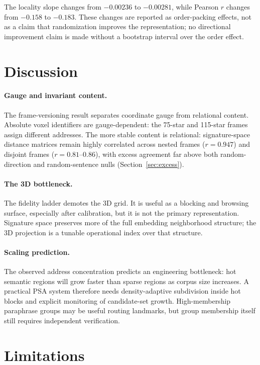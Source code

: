 \documentclass[11pt]{article}
\begin{document}
The locality slope changes from $-0.00236$ to $-0.00281$, while Pearson $r$ changes from $-0.158$ to $-0.183$. These changes are reported as order-packing effects, not as a claim that randomization improves the representation; no directional improvement claim is made without a bootstrap interval over the order effect.

\section{Discussion}

\paragraph{Gauge and invariant content.}
The frame-versioning result separates coordinate gauge from relational content. Absolute voxel identifiers are gauge-dependent: the 75-star and 115-star frames assign different addresses. The more stable content is relational: signature-space distance matrices remain highly correlated across nested frames ($r=0.947$) and disjoint frames ($r=0.81$--$0.86$), with excess agreement far above both random-direction and random-sentence nulls (Section~\ref{sec:excess}).

\paragraph{The 3D bottleneck.}
The fidelity ladder demotes the 3D grid. It is useful as a blocking and browsing surface, especially after calibration, but it is not the primary representation. Signature space preserves more of the full embedding neighborhood structure; the 3D projection is a tunable operational index over that structure.

\paragraph{Scaling prediction.}
The observed address concentration predicts an engineering bottleneck: hot semantic regions will grow faster than sparse regions as corpus size increases. A practical PSA system therefore needs density-adaptive subdivision inside hot blocks and explicit monitoring of candidate-set growth. High-membership paraphrase groups may be useful routing landmarks, but group membership itself still requires independent verification.

\section{Limitations}
\end{document}
